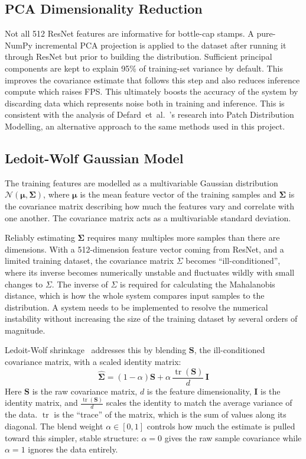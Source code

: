 \documentclass[conference]{IEEEtran}
\begin{document}
\subsection{PCA Dimensionality Reduction}

Not all 512 ResNet features are informative for bottle-cap stamps. A pure-NumPy incremental PCA projection is applied to the dataset after running it through ResNet but prior to building the distribution. Sufficient principal components are kept to explain 95\% of training-set variance by default. This improves the covariance estimate that follows this step and also reduces inference compute which raises FPS. This ultimately boosts the accuracy of the system by discarding data which represents noise both in training and inference. This is consistent with the analysis of Defard~et~al.~\cite{defard2021padim}'s research into Patch Distribution Modelling, an alternative approach to the same methods used in this project.

\subsection{Ledoit-Wolf Gaussian Model}
The training features are modelled as a multivariable Gaussian distribution $\mathcal{N}(\boldsymbol{\mu}, \boldsymbol{\Sigma})$, where $\boldsymbol{\mu}$ is the mean feature vector of the training samples and $\boldsymbol{\Sigma}$ is the covariance matrix describing how
much the features vary and correlate with one another. The covariance matrix acts as a multivariable standard deviation.

Reliably estimating $\boldsymbol{\Sigma}$ requires many multiples more samples than there are dimensions. With a 512-dimension feature vector coming from ResNet, and a limited training dataset, the covariance matrix $\Sigma$ becomes ``ill-conditioned'', where its inverse becomes numerically unstable and fluctuates wildly with small changes to $\Sigma$. The inverse of $\Sigma$ is required for calculating the Mahalanobis distance, which is how the whole system compares input samples to the distribution. A system needs to be implemented to resolve the numerical instability without increasing the size of the training dataset by several orders of magnitude.

Ledoit-Wolf shrinkage~\cite{ledoit2004well} addresses this by blending $\mathbf{S}$, the ill-conditioned covariance matrix, with a scaled identity matrix:
\begin{equation}
    \hat{\boldsymbol{\Sigma}} = (1-\alpha)\mathbf{S} +
    \alpha\,\frac{\operatorname{tr}(\mathbf{S})}{d}\,\mathbf{I}
\end{equation}
Here $\mathbf{S}$ is the raw covariance matrix, $d$ is the feature dimensionality, $\mathbf{I}$ is the identity matrix, and $\frac{\operatorname{tr}(\mathbf{S})}{d}$ scales the identity to match the average variance of the data. $\operatorname{tr}$ is the ``trace'' of the matrix, which is the sum of values along its diagonal. The blend weight $\alpha\in[0,1]$ controls how much the estimate is pulled toward this simpler, stable structure: $\alpha=0$ gives the raw sample covariance while $\alpha=1$ ignores the data entirely. 
\end{document}
